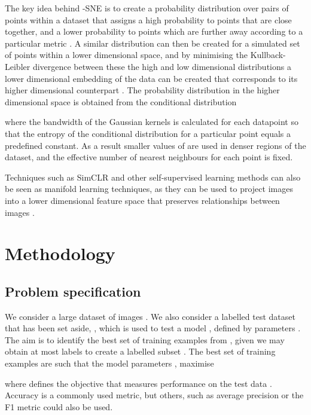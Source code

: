 \documentclass{article}
\begin{document}
The key idea behind -SNE is to create a probability distribution over pairs of points within a dataset that assigns a high probability to points  that are close together, and a lower probability to points which are further away according to a particular metric . A similar distribution can then be created for a simulated set of points within a lower dimensional space, and by minimising the Kullback-Leibler divergence between these the high and low dimensional distributions a lower dimensional embedding of the data can be created that corresponds to its higher dimensional counterpart \citep{van2008visualizing}. The probability distribution in the higher dimensional space is obtained from the conditional distribution



where the bandwidth of the Gaussian kernels  is calculated for each datapoint so that the entropy of the conditional distribution for a particular point equals a predefined constant. As a result smaller values of  are used in denser regions of the dataset, and the effective number of nearest neighbours for each point is fixed.

Techniques such as SimCLR and other self-supervised learning methods can also be seen as manifold learning techniques, as they can be used to project images into a lower dimensional feature space that preserves relationships between images \citep{balestriero2022contrastive}.



\section{Methodology}
\subsection{Problem specification}

We consider a large dataset of images . We also consider a labelled test dataset that has been set aside, , which is used to test a model , defined by parameters . The aim is to identify the best set of training examples  from , given we may obtain at most  labels to create a labelled subset . The best set of training examples are such that the model parameters , maximise



where  defines the objective that measures performance on the test data . Accuracy is a commonly used metric, but others, such as average precision or the F1 metric could also be used. 
\end{document}
